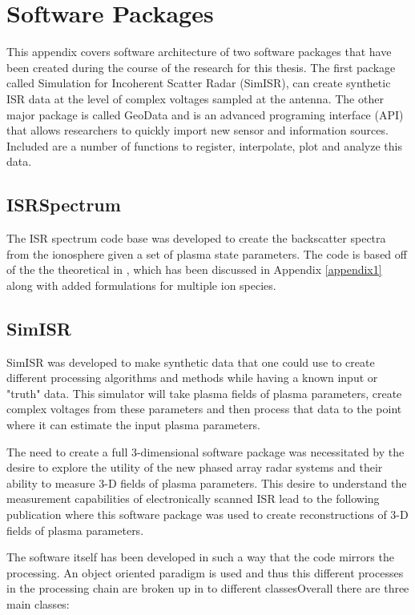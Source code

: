 \chapter{Software Packages}
\label{chapter:appsoft}
\thispagestyle{myheadings}

\graphicspath{{Appendix/Figures/}}


This appendix covers software architecture of two software packages that have been created during the course of the research for this thesis. The first package called Simulation for Incoherent Scatter Radar (SimISR), can create synthetic ISR data at the level of complex voltages sampled at the antenna. The other major package is called GeoData and is an advanced programing interface (API) that allows researchers to quickly import new sensor and information sources. Included are a number of functions to register, interpolate, plot and analyze this data.

\section{ISRSpectrum}
The ISR spectrum code base was developed to create the backscatter spectra from the ionosphere given a set of plasma state parameters. The code is based off of the the theoretical in \cite{kudeki:milla:1}, which has been discussed in Appendix \ref{appendix1} along with added formulations for multiple ion species.
\section{SimISR}

SimISR was developed to make synthetic data that one could use to create different processing algorithms and methods while having a known input or "truth" data. This simulator will take plasma fields of plasma parameters, create complex voltages from these parameters and then process that data to the point where it can estimate the input plasma parameters.

The need to create a full 3-dimensional software package was necessitated by the desire to explore the utility of the new phased array radar systems and their ability to measure 3-D fields of plasma parameters. This desire to understand the measurement capabilities of electronically scanned ISR lead to the following publication \cite{RDS:RDS20236} where this software package was used to create reconstructions of 3-D fields of plasma parameters.

The software itself has been developed in such a way that the code mirrors the processing. An object oriented paradigm is used and thus this different processes in the processing chain are broken up in to different classesOverall there are three main classes: 

